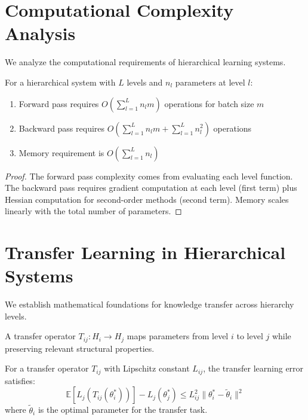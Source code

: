\section{Computational Complexity Analysis}

We analyze the computational requirements of hierarchical learning systems.

\begin{theorem}
\label{thm:hierarchical_complexity}
For a hierarchical system with $L$ levels and $n_l$ parameters at level $l$:
\begin{enumerate}
\item Forward pass requires $O(\sum_{l=1}^L n_l m)$ operations for batch size $m$
\item Backward pass requires $O(\sum_{l=1}^L n_l m + \sum_{l=1}^L n_l^2)$ operations
\item Memory requirement is $O(\sum_{l=1}^L n_l)$
\end{enumerate}
\end{theorem}

\begin{proof}
The forward pass complexity comes from evaluating each level function. The backward pass requires gradient computation at each level (first term) plus Hessian computation for second-order methods (second term). Memory scales linearly with the total number of parameters.
\end{proof}

\section{Transfer Learning in Hierarchical Systems}

We establish mathematical foundations for knowledge transfer across hierarchy levels.

\begin{definition}
\label{def:transfer_operator}
A transfer operator $T_{ij}: H_i \to H_j$ maps parameters from level $i$ to level $j$ while preserving relevant structural properties.
\end{definition}

\begin{theorem}
\label{thm:transfer_bounds}
For a transfer operator $T_{ij}$ with Lipschitz constant $L_{ij}$, the transfer learning error satisfies:
$$\mathbb{E}[L_j(T_{ij}(\theta_i^*))] - L_j(\theta_j^*) \leq L_{ij}^2 \|\theta_i^* - \tilde{\theta}_i\|^2$$
where $\tilde{\theta}_i$ is the optimal parameter for the transfer task.
\end{theorem}

